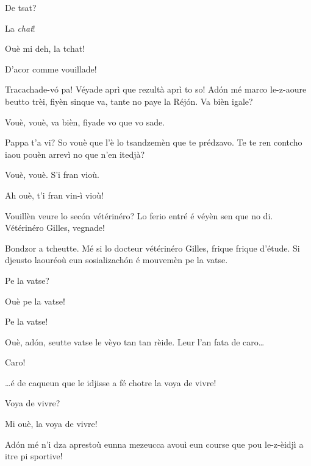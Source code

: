 \begin{drama}
\Cienspeaks De tsat?

\Schulzspeaks La \textit{chat}!

\Mariettospeaks{} Ouè mi deh, la tchat!

\Cienspeaks{} D'acor comme vouillade!

\Schulzspeaks Tracachade-v\'o pa! Véyade aprì que rezultà aprì to so! Ad\'on mé marco le-z-aoure beutto trèi, fiyèn sinque va, tante no paye la Réjón. Va bièn igale?

\Cienspeaks Vouè, vouè, va bièn, fiyade vo que vo sade.



\Simonspeaks Pappa t’a vi? So vouè que l’è lo tsandzemèn que te pré\-dza\-vo. Te te ren contcho iaou pouèn arrevì no que n’en itedjà?

\Cienspeaks Vouè, vouè. S’i fran vioù.

\Mariettospeaks Ah ouè, t'i fran vin-ì vioù!


\Chefspeaks Vouillèn veure lo sec\'on vétérinéro? Lo ferio entré é vé\-yèn sen que no di. Vétérinéro Gilles, vegnade!


\Maracanaspeaks Bondzor a tcheutte. Mé si lo docteur vétérinéro Gilles, fri\-que frique d’étude. Si djeusto laouréoù eun sosializach\'on é mouvemèn pe la vatse.

\Cienspeaks Pe la vatse?

\Maracanaspeaks Ouè pe la vatse!

\Mariettospeaks Pe la vatse!

\Maracanaspeaks Ouè, ad\'on, seutte vatse le vèyo tan tan rèide. Leur l’an fata de caro\ldots

\Mariettospeaks Caro!

\Maracanaspeaks \ldots é de caqueun que le idjisse a fé chotre la voya de vivre!

\Cienspeaks Voya de vivre?

\Mariettospeaks{} Mi ouè, la voya de vivre!

\Maracanaspeaks  Ad\'on mé n’i dza aprestoù eunna mezeucca avouì eun cour\-se que pou le-z-èidjì a itre pi sportive!


\end{drama}
